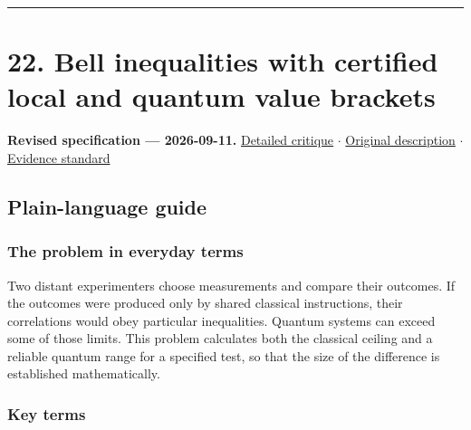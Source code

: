 \documentclass[
  11pt,
]{article}
\begin{document}
\begin{center}\rule{0.5\linewidth}{0.5pt}\end{center}

\section{22. Bell inequalities with certified local and quantum value
brackets}

\textbf{Revised specification --- 2026-09-11.}
\href{https://github.com/rick-stevens-ai/Pure-Thought/blob/main/reviews/22-Bell-Inequalities-Nonlocality.md}{Detailed
critique} \ensuremath{\cdot}
\href{https://github.com/rick-stevens-ai/Pure-Thought/blob/main/archive/original-PRDs/22-Bell-Inequalities-Nonlocality.md}{Original
description} \ensuremath{\cdot}
\href{https://github.com/rick-stevens-ai/Pure-Thought/blob/main/reviews/EVIDENCE-STANDARD.md}{Evidence
standard}

\subsection{Plain-language guide}

\subsubsection{The problem in everyday terms}

Two distant experimenters choose measurements and compare their
outcomes. If the outcomes were produced only by shared classical
instructions, their correlations would obey particular inequalities.
Quantum systems can exceed some of those limits. This problem calculates
both the classical ceiling and a reliable quantum range for a specified
test, so that the size of the difference is established mathematically.

\subsubsection{Key terms}
\end{document}
